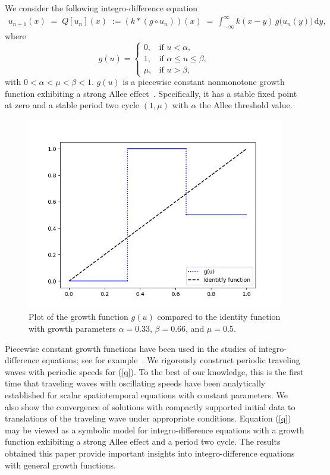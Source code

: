 \documentclass[11pt]{article}
\theoremstyle{definition}
\numberwithin{equation}{section}
\numberwithin{thm}{section}
\renewcommand{\a}{\alpha}
\renewcommand{\b}{\beta}
\newcommand{\m}{\mu}
\begin{document}
We consider the following integro-difference equation
\begin{align}\label{q}
u_{n+1}(x)\;=\;Q[u_n](x)\;:=(k*(g\circ u_n))(x)\;=\,\int^{\infty}_{-\infty}k(x-y)\,g\big(u_n(y)\big)\,\mathrm{d}y,
\end{align}
where 
\begin{equation} \label{g}
g(u) = \begin{cases}
0, & \text{if } u < \a, \\
1, & \text{if } \a \leq u \leq \b, \\
\m, & \text{if } u > \b,
\end{cases}
\end{equation}
with $0<\a<\m<\b<1$. $g(u)$ is a piecewise constant nonmonotone growth function exhibiting a strong Allee effect~\cite{all}. Specifically, it has a stable fixed point at zero and a stable period two cycle $(1,\m)$ with $\a$ the Allee threshold value.

\begin{figure}[h!]
\centering
  \caption{Plot of the growth function $g(u)$ compared to the identity function with growth parameters $\alpha=0.33$, $\beta=0.66$, and $\mu=0.5$.}
  \includegraphics[width=.8\linewidth]{figures/fig1.png}
\end{figure}

Piecewise constant growth functions have been used in the studies of integro-difference equations; see for example~\cite{kot1, lut,otto,  pnas}. We rigorously construct periodic traveling waves with periodic speeds for (\ref{q}). To the best of our knowledge, this is the first time that traveling waves with oscillating speeds have been analytically established  for scalar spatiotemporal equations with constant parameters. We also show the convergence of solutions with compactly supported initial data to translations of the traveling wave under appropriate conditions. Equation (\ref{q}) may be viewed as a symbolic model for integro-difference equations with a growth function exhibiting a strong Allee effect and a period two cycle. The results obtained this paper provide important insights into integro-difference equations with general growth functions. 
\end{document}
